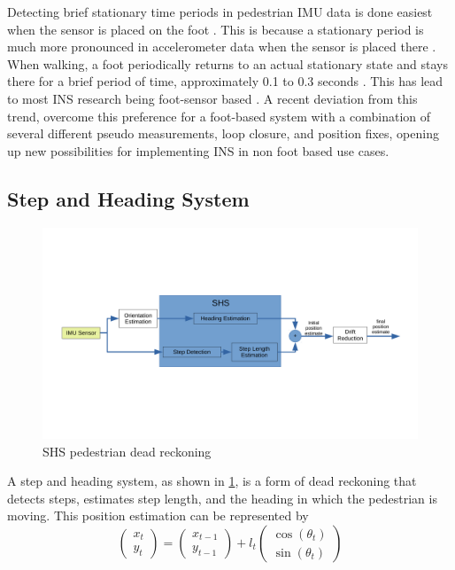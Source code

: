 Detecting brief stationary time periods in pedestrian IMU data is done easiest when the sensor is placed on the foot \cite{Diez2018,Davidson2017}. This is because a stationary period is much more pronounced in accelerometer data when the sensor is placed there \cite{Yu2019,Wu2019}.  When walking, a foot periodically returns to an actual stationary state and stays there for a brief period of time, approximately 0.1 to 0.3 seconds \cite{Ren2016a}. This has lead to most \ac{INS} research being foot-sensor based \cite{Diez2018,Wu2019}. A recent deviation from this trend, \citet{Solin2018a} overcome this preference for a foot-based system with a combination of several different pseudo measurements, loop closure, and position fixes, opening up new possibilities for implementing INS in non foot based use cases.\\

\subsection{Step and Heading System}
\label{sec:rw-SHS}
\begin{figure}[H]
	\centering
	\includegraphics[trim=40 120 180 80, clip,width=\linewidth]{images/shs_diagram}
	\caption{\ac{SHS} pedestrian dead reckoning}
	\label{fig:shs_diagram}
\end{figure}
A step and heading system, as shown in \cref{fig:shs_diagram}, is a form of dead reckoning that detects steps, estimates step length, and the heading in which the pedestrian is moving. This position estimation can be represented by \cite{MunozDiaz2019}
\begin{equation}
	\label{eq:SHS_dynamic_model}
	\left(\begin{array}{l}
		x_t \\
		y_t
	\end{array}\right) 
	=
	\left(\begin{array}{l}
		x_{t-1} \\
		y_{t-1}
	\end{array}\right) 
	+l_{t} \left(\begin{array}{l}
		\cos \left(\theta_{t}\right) \\
		\sin \left(\theta_{t}\right)
	\end{array}\right)
\end{equation}

